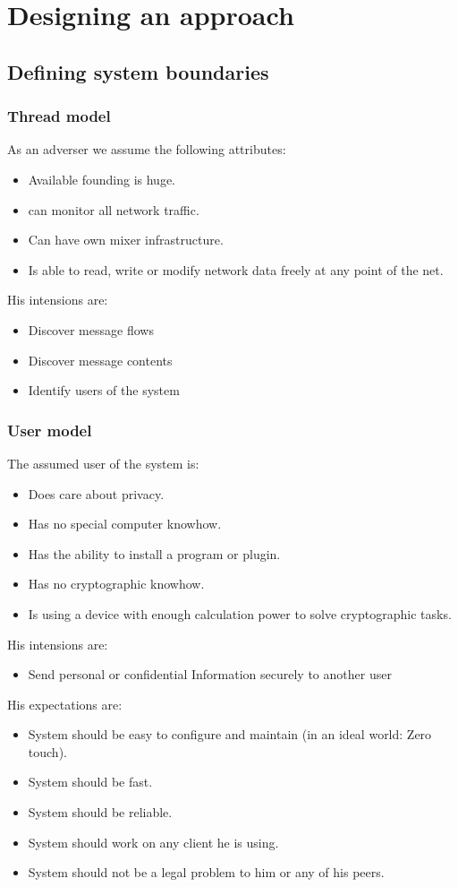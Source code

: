 \chapter{Designing an approach}
\section{Defining system boundaries}
\subsection{Thread model}
As an adverser we assume the following attributes:
\begin{itemize}
\item Available founding is huge.
\item can monitor all network traffic.
\item Can have own mixer infrastructure.
\item Is able to read, write or modify network data freely at any point of the net.
\end{itemize}
His intensions are:
\begin{itemize}
\item Discover message flows
\item Discover message contents
\item Identify users of the system
\end{itemize}

\subsection{User model}
The assumed user of the system is:
\begin{itemize}
\item Does care about privacy.
\item Has no special computer knowhow.
\item Has the ability to install a program or plugin.
\item Has no cryptographic knowhow.
\item Is using a device with enough calculation power to solve cryptographic tasks.
\end{itemize}
His intensions are:
\begin{itemize}
\item Send personal or confidential Information securely to another user
\end{itemize}
His expectations are:
\begin{itemize}
\item System should be easy to configure and maintain (in an ideal world: Zero touch). 
\item System should be fast.
\item System should be reliable.
\item System should work on any client he is using.
\item System should not be a legal problem to him or any of his peers.
\end{itemize}

